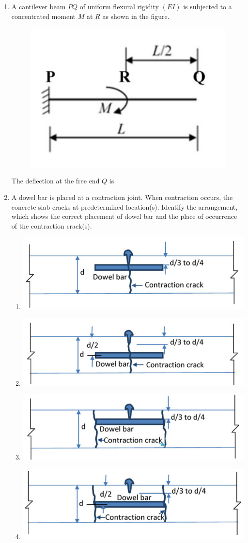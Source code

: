 \documentclass[journal]{IEEEtran}
\begin{document}
\begin{enumerate}
\begin{enumerate}
\end{enumerate}

\item A cantilever beam $PQ$ of uniform flexural rigidity $(EI)$ is subjected to a concentrated moment $M$ at $R$ as shown in the figure.  

\begin{figure}[H]
    \centering
    \includegraphics[width=0.3\columnwidth]{figs/Q40.png} 
    \caption{}
    \label{fig:placeholder}
\end{figure}

The deflection at the free end $Q$ is  \hfill {}
\begin{enumerate}

\end{enumerate}

\item A dowel bar is placed at a contraction joint. When contraction occurs, the concrete slab cracks at predetermined location(s). Identify the arrangement, which shows the correct placement of dowel bar and the place of occurrence of the contraction crack(s).  \hfill {}


\begin{enumerate}
\item \includegraphics[width=0.3\columnwidth]{figs/Q41a.png}
\item \includegraphics[width=0.3\columnwidth]{figs/Q41b.png}
\item \includegraphics[width=0.3\columnwidth]{figs/Q41c.png}
\item \includegraphics[width=0.3\columnwidth]{figs/Q41d.png}
\end{enumerate}



\end{enumerate}
\end{document}
